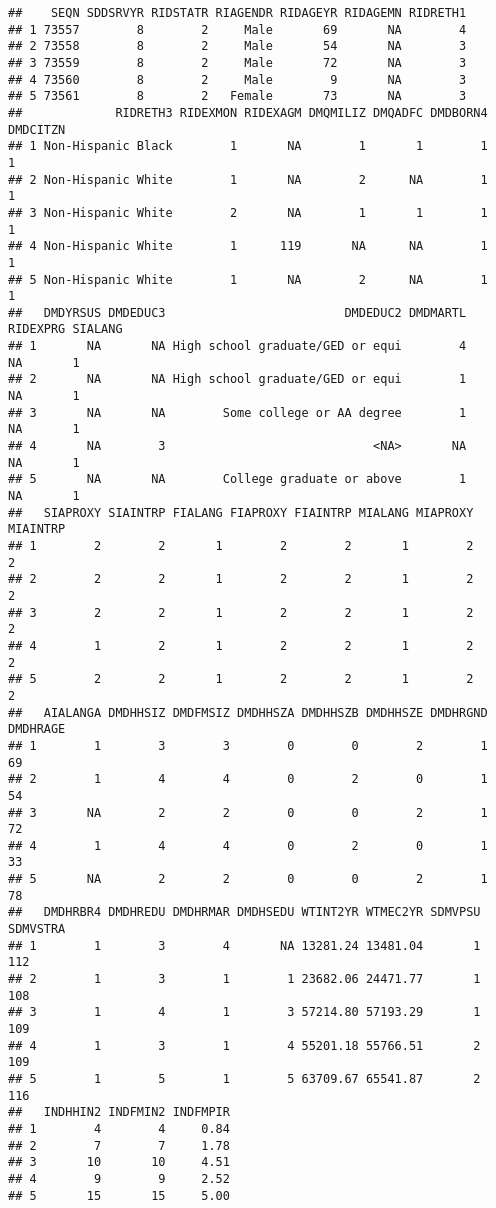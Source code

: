 \documentclass[
]{book}
\begin{document}
\begin{verbatim}
##    SEQN SDDSRVYR RIDSTATR RIAGENDR RIDAGEYR RIDAGEMN RIDRETH1
## 1 73557        8        2     Male       69       NA        4
## 2 73558        8        2     Male       54       NA        3
## 3 73559        8        2     Male       72       NA        3
## 4 73560        8        2     Male        9       NA        3
## 5 73561        8        2   Female       73       NA        3
##             RIDRETH3 RIDEXMON RIDEXAGM DMQMILIZ DMQADFC DMDBORN4 DMDCITZN
## 1 Non-Hispanic Black        1       NA        1       1        1        1
## 2 Non-Hispanic White        1       NA        2      NA        1        1
## 3 Non-Hispanic White        2       NA        1       1        1        1
## 4 Non-Hispanic White        1      119       NA      NA        1        1
## 5 Non-Hispanic White        1       NA        2      NA        1        1
##   DMDYRSUS DMDEDUC3                         DMDEDUC2 DMDMARTL RIDEXPRG SIALANG
## 1       NA       NA High school graduate/GED or equi        4       NA       1
## 2       NA       NA High school graduate/GED or equi        1       NA       1
## 3       NA       NA        Some college or AA degree        1       NA       1
## 4       NA        3                             <NA>       NA       NA       1
## 5       NA       NA        College graduate or above        1       NA       1
##   SIAPROXY SIAINTRP FIALANG FIAPROXY FIAINTRP MIALANG MIAPROXY MIAINTRP
## 1        2        2       1        2        2       1        2        2
## 2        2        2       1        2        2       1        2        2
## 3        2        2       1        2        2       1        2        2
## 4        1        2       1        2        2       1        2        2
## 5        2        2       1        2        2       1        2        2
##   AIALANGA DMDHHSIZ DMDFMSIZ DMDHHSZA DMDHHSZB DMDHHSZE DMDHRGND DMDHRAGE
## 1        1        3        3        0        0        2        1       69
## 2        1        4        4        0        2        0        1       54
## 3       NA        2        2        0        0        2        1       72
## 4        1        4        4        0        2        0        1       33
## 5       NA        2        2        0        0        2        1       78
##   DMDHRBR4 DMDHREDU DMDHRMAR DMDHSEDU WTINT2YR WTMEC2YR SDMVPSU SDMVSTRA
## 1        1        3        4       NA 13281.24 13481.04       1      112
## 2        1        3        1        1 23682.06 24471.77       1      108
## 3        1        4        1        3 57214.80 57193.29       1      109
## 4        1        3        1        4 55201.18 55766.51       2      109
## 5        1        5        1        5 63709.67 65541.87       2      116
##   INDHHIN2 INDFMIN2 INDFMPIR
## 1        4        4     0.84
## 2        7        7     1.78
## 3       10       10     4.51
## 4        9        9     2.52
## 5       15       15     5.00
\end{verbatim}
\end{document}
